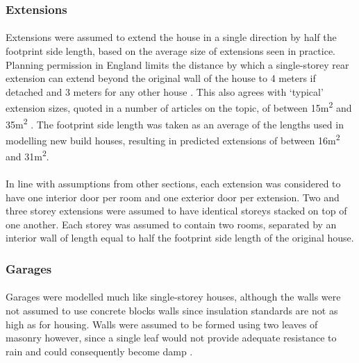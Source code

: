 \documentclass[12pt]{article}
\begin{document}
\subsubsection{Extensions}
\label{extensions}

\paragraph{}
Extensions were assumed to extend the house in a single direction by half the footprint side length, based on the average size of extensions seen in practice. Planning permission in England limits the distance by which a single-storey rear extension can extend beyond the original wall of the house to 4 meters if detached and 3 meters for any other house \citep{Garrett2015-bb}. This also agrees with ‘typical’ extension sizes, quoted in a number of articles on the topic, of between 15m\textsuperscript{2} and 35m\textsuperscript{2} \citep{Warwick2019-wt,velux_undated-ea,Searle2018-qb,sterlingbuild_undated-kj,Madsen2012-jm}. The footprint side length was taken as an average of the lengths used in modelling new build houses, resulting in predicted extensions of between 16m\textsuperscript{2} and 31m\textsuperscript{2}. 

\paragraph{}
In line with assumptions from other sections, each extension was considered to have one interior door per room and one exterior door per extension. Two and three storey extensions were assumed to have identical storeys stacked on top of one another. Each storey was assumed to contain two rooms, separated by an interior wall of length equal to half the footprint side length of the original house.

\subsubsection{Garages}
\label{garages}

\paragraph{}
Garages were modelled much like single-storey houses, although the walls were not assumed to use concrete blocks walls since insulation standards are not as high as for housing. Walls were assumed to be formed using two leaves of masonry however, since a single leaf would not provide adequate resistance to rain and could consequently become damp \citep{National_House-Building_Council2011-qi}. 
\end{document}
